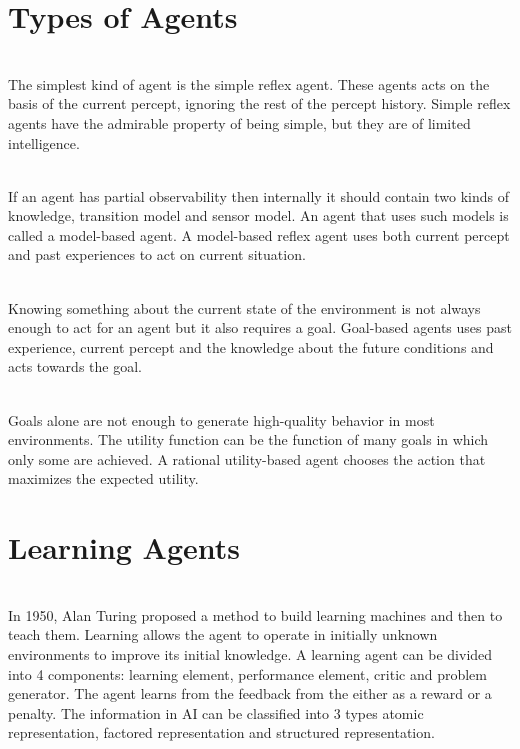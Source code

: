 \documentclass{article}
\begin{document}
\section{Types of Agents}
\begin{paragraph}
\\
The simplest kind of agent is the simple reflex agent. These agents acts on the basis of the current percept, ignoring the rest of the percept history. Simple reflex agents have the admirable property of being simple, but they are of limited intelligence.
\end{paragraph}
\begin{paragraph}
\\
If an agent has partial observability then internally it should contain two kinds of knowledge, transition model and sensor model. An agent that uses such models is called a model-based agent. A model-based reflex agent uses both current percept and past experiences to act on current situation. 
\end{paragraph}
\begin{paragraph}
\\
Knowing something about the current state of the environment is not always enough to act for an agent but it also requires a goal. Goal-based agents uses past experience, current percept and the knowledge about the future conditions and acts towards the goal.
\end{paragraph}
\begin{paragraph}
\\
Goals alone are not enough to generate high-quality behavior in most environments. The utility function can be the function of many goals in which only some are achieved. A rational utility-based agent chooses the action that maximizes the expected utility.
\end{paragraph}
\section{Learning Agents}
\begin{paragraph}
\\
In 1950, Alan Turing proposed a method to build learning machines and then to teach them. Learning allows the agent to operate in initially unknown environments to improve its initial knowledge. A learning agent can be divided into 4 components: learning element, performance element, critic and problem generator. The agent learns from the feedback from the either as a reward or a penalty. The information in AI can be classified into 3 types atomic representation, factored representation and structured representation.
\end{paragraph}
\end{document}
